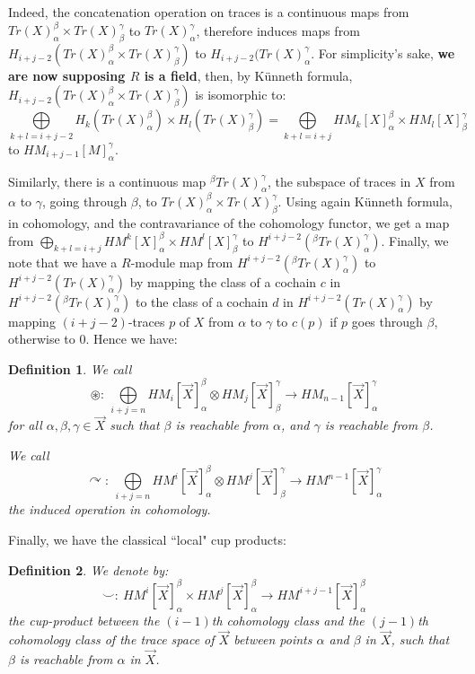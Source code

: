 \documentclass{article}
\newtheorem{definition}{Definition}[section]
\begin{document}
Indeed, the concatenation operation on traces is a continuous maps from $Tr(X)^\beta_\alpha \times Tr(X)_\beta^\gamma$ to $Tr(X)_\alpha^\gamma$, therefore induces maps from $H_{i+j-2}(Tr(X)_\alpha^\beta
\times Tr(X)_\beta^\gamma)$
 to 
$H_{i+j-2}(Tr(X)_\alpha^\gamma$. For simplicity's sake, {\bf we are now supposing $R$ is a field}, then, by K\"unneth formula, $H_{i+j-2}(Tr(X)_\alpha^\beta
\times Tr(X)_\beta^\gamma)$ is isomorphic to: 
$$\mathop{\bigoplus}\limits_{k+l=i+j-2}
H_k(Tr(X)_\alpha^\beta)\times H_l(Tr(X)_\beta^\gamma)=\mathop{\bigoplus}\limits_{k+l=i+j}
HM_k[X]_\alpha^\beta\times HM_l[X]_\beta^\gamma$$
 to $HM_{i+j-1}[M]_\alpha^\gamma$. 

Similarly, there is a continuous map ${ }^\beta Tr(X)^\gamma_\alpha$, the subspace of traces in $X$ from $\alpha$ to $\gamma$, going through $\beta$, to $Tr(X)_\alpha^\beta\times Tr(X)_\beta^\gamma$. Using again K\"unneth formula, in cohomology, and the contravariance of the cohomology functor, we get a map from 
$\mathop{\bigoplus}\limits_{k+l=i+j}
HM^k[X]_\alpha^\beta\times HM^l[X]_\beta^\gamma$ to 
$H^{i+j-2}({ }^\beta Tr(X)_\alpha^\gamma)$. Finally, we note that we have a $R$-module map from $H^{i+j-2}({ }^\beta Tr(X)_\alpha^\gamma)$ to $H^{i+j-2}(Tr(X)_\alpha^\gamma)$ by mapping the class of a cochain $c$ in $H^{i+j-2}({ }^\beta Tr(X)_\alpha^\gamma)$ to the class of a cochain $d$ in $H^{i+j-2}(Tr(X)_\alpha^\gamma)$ by mapping $(i+j-2)$-traces $p$ of $X$ from $\alpha$ to $\gamma$ to $c(p)$ if $p$ goes through $\beta$, otherwise to $0$. Hence we have: 

\begin{definition}
We call $$\circledast: \ \mathop{\bigoplus}\limits_{i+j=n} HM_i[\Vec{X}]_\alpha^\beta \otimes HM_j[\Vec{X}]_\beta^\gamma \rightarrow HM_{n-1}[\Vec{X}]_\alpha^\gamma$$ 
\noindent for all %
$\alpha,\beta,\gamma \in \Vec{X}$ such that $\beta$ is reachable from $\alpha$, and $\gamma$ is reachable from $\beta$.

We call $$\curvearrowright: \ \bigoplus\limits_{i+j=n} HM^i[\Vec{X}]_\alpha^\beta \otimes HM^j[\Vec{X}]_\beta^\gamma \rightarrow HM^{n-1}[\Vec{X}]_\alpha^\gamma$$ the induced operation in cohomology. 
\end{definition}

Finally, we have the classical ``local" cup products: 

\begin{definition}
We denote by: 
$$\smile: \ HM^i[\Vec{X}]_\alpha^\beta \times HM^j[\Vec{X}]_\alpha^\beta \rightarrow HM^{i+j-1}[\Vec{X}]_\alpha^\beta$$
\noindent the cup-product between the $(i-1)$th cohomology class and the $(j-1)$th cohomology class of the trace space of $\Vec{X}$ between points $\alpha$ and $\beta$ in $\Vec{X}$, such that $\beta$ is reachable from $\alpha$ in $\Vec{X}$. 
\end{definition}
\end{document}
